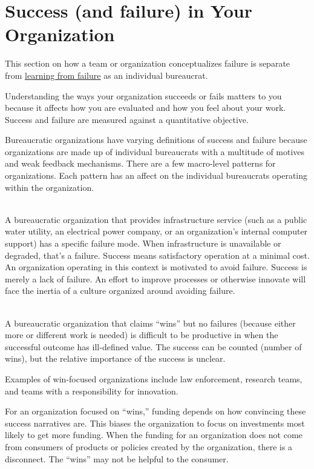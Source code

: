 \section{Success (and failure) in Your Organization\label{sec:org-failure-and-success}}

This section on how a team or organization conceptualizes failure is separate from %
\hyperref[sec:learn-from-failure]{learning from failure} 
as an individual bureaucrat. 

Understanding the ways your organization succeeds or fails matters to you because it affects how you are evaluated and how you feel about your work. Success and failure are measured against a quantitative objective. 


Bureaucratic organizations have varying definitions of success and failure because organizations are made up of individual bureaucrats with a multitude of motives and weak feedback mechanisms. There are a few macro-level patterns for organizations. Each pattern has an affect on the individual bureaucrats operating within the organization. 

\ \\

A bureaucratic organization that provides infrastructure service (such as a public water utility, an electrical power company, or an organization's internal computer support) has a specific failure mode. When infrastructure is unavailable or degraded, that's a failure. Success means satisfactory operation at a minimal cost. An organization operating in this context is motivated to avoid failure. Success is merely a lack of failure. An effort to improve processes or otherwise innovate will face the inertia of a culture organized around avoiding failure. 

\ \\

A bureaucratic organization that claims ``wins'' but no failures (because either more or different work is needed) is difficult to be productive in when the successful outcome has ill-defined value. The success can be counted (number of wins), but the relative importance of the success is unclear.

Examples of win-focused organizations include law enforcement, research teams, and teams with a responsibility for innovation. 

For an organization focused on ``wins,'' funding depends on how convincing these success narratives are. This biases the organization to focus on investments most likely to get more funding. When the funding for an organization does not come from consumers of products or policies created by the organization, there is a disconnect. The ``wins'' may not be helpful to the consumer.


